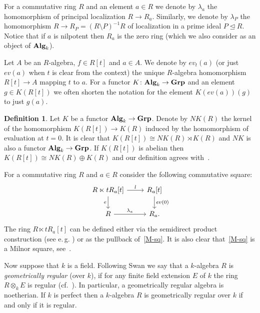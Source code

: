 \documentclass[oneside, 11pt]{amsart} \pdfoutput=1
\numberwithin{equation}{section}
\theoremstyle{definition}
\newtheorem{df}[lemma]{Definition}
\newcommand{\catname}[1]{{\normalfont\textbf{#1}}} %
\begin{document}
For a commutative ring $R$ and an element $a\in R$ we denote by $\lambda_a$ the homomorphism of principal localization $R \to R_a$. Similarly, we denote by $\lambda_P$ the homomorphism $R \to R_P = (R\setminus P)^{-1}R$ of localization in a prime ideal $P \trianglelefteq R$. Notice that if $a$ is nilpotent then $R_a$ is the zero ring (which we also consider as an object of $\catname{Alg}_k$). 

Let $A$ be an $R$-algebra, $f\in R[t]$ and $a \in A$. We denote by $ev_t(a)$ (or just $ev(a)$ when $t$ is clear from the context) the unique $R$-algebra homomorphism $R[t] \to A$ mapping $t$ to $a$. For a functor $K \colon \catname{Alg}_k \to \catname{Grp}$ and an element $g \in K(R[t])$ we often shorten the notation for the element $K(ev(a))(g)$ to just $g(a)$.

\begin{df}\label{df:NK}
Let $K$ be a functor $\catname{Alg}_k \to \catname{Grp}$.
Denote by $NK(R)$ the kernel of the homomorphism $K(R[t]) \to K(R)$ induced by the homomorphism of evaluation at $t=0$. It is clear that $K(R[t]) \cong NK(R) \rtimes K(R)$ and $NK$ is also a functor $\catname{Alg}_k \to \catname{Grp}$. If $K(R[t])$ is abelian then $K(R[t]) \cong NK(R) \oplus K(R)$ and our definition agrees with~\cite[Def.~III.3.3]{Kbook}.
\end{df}

For a commutative ring $R$ and $a \in R$ consider the following commutative square:
  \begin{equation} \label{M-sq} \begin{tikzcd} R \ltimes t R_a[t] \ar{r}{l} \ar{d}[swap]{e} & R_a[t] \ar{d}{ev(0)} \\ R \ar{r}{\lambda_a} & R_a. \end{tikzcd}\end{equation}
  The ring $R \ltimes tR_a[t]$ can be defined either via the semidirect product construction (see e.\,g. \cite[Definition~3.2]{S15}) or as the pullback of~\eqref{M-sq}.
  It is also clear that~\eqref{M-sq} is a Milnor square, see~\cite[Example~I.2.6]{Kbook}.

Now suppose that $k$ is a field. Following Swan we say that a $k$-algebra $R$ is {\it geometrically regular} (over $k$), if for any finite field extension $E$ of $k$ the ring $R\otimes_kE$ is regular (cf.~\cite[p.~137]{Sw98}). In particular, a geometrically regular algebra is noetherian. If $k$ is perfect then a $k$-algebra $R$ is geometrically regular over $k$ if and only if it is regular.
\end{document}
